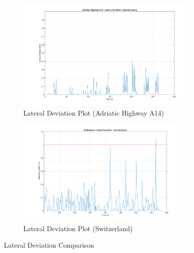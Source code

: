 \begin{figure}[H]
\centering

    \begin{subfigure}{.5\textwidth}
    \centering
   \includegraphics[width=\textwidth,keepaspectratio]{Figures/A14_lateralDev.png}
    \caption{Lateral Deviation Plot (Adriatic Highway A14)}
    \label{subfig:A14}
    \end{subfigure}%
    \begin{subfigure}{.5\textwidth}
    \centering
    \includegraphics[width=0.95\textwidth,keepaspectratio]{Figures/Switzerland_lateralDev.png}
    \caption{Lateral Deviation Plot (Switzerland)}
    \label{subfig:Switzerland}
    \end{subfigure}
    \caption{Lateral Deviation Comparison}
    \label{fig:lateral_dev_comparison}
\end{figure}


